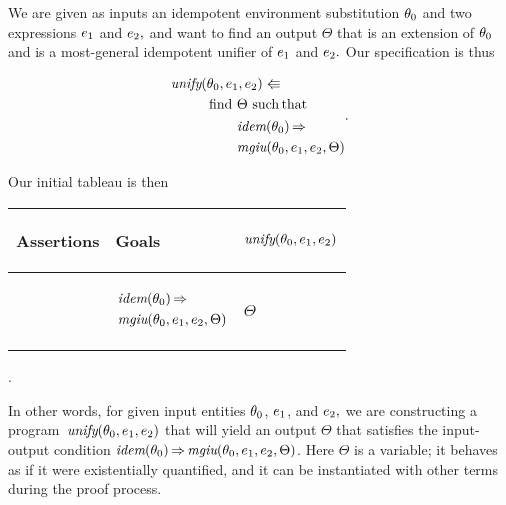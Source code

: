 \documentclass[runningheads]{llncs}
\DeclareMathOperator{\uimplies}{\Rightarrow}
\DeclareMathOperator{\unify}{\emph{unify}}
\DeclareMathOperator{\idem}{\emph{idem}}
\DeclareMathOperator{\mgiu}{\emph{mgiu}}
\begin{document}
We are given as inputs an idempotent environment substitution $\theta_{0}$ and two expressions $e_{1}$ and $e_{2},$ and want to find an output $\Theta$ that is an extension of $\theta_{0}$ and is a most-general idempotent unifier of $e_{1}$ and $e_{2}.$  Our specification is thus


\begin{alignat*}{2}
  \begin{split}
   \unify(&\thet{0}, \e{1}, \e{2}) \Lleftarrow  \\ 
&\operatorname{find} \, \Theta \,
     \operatorname{such}\operatorname{that} \\
&\begin{aligned}
  &&&&& \idem(\thet{0}) \uimplies  \\
  &&&&& \mgiu(\thet{0}, \e{1}, \e{2}, \Theta) 
   \end{aligned}
  \end{split}.
\end{alignat*}

   
\vspace*{.2cm}
\noindent Our initial tableau is then

\begin{center}  
\begin{tabular}{T}
 \hline
\begin{center}  Assertions \end{center}&
\begin{center}  Goals  \end{center}  &
\begin{center}  $\unify(\thet{0}, \e{1}, \e{2})$  \end{center}\\
 \hline\hline
  & \begin{center}$\begin{aligned}[t] &\idem(\thet{0}) \uimplies \\  &\,{\mgiu}(\thet{0}, \e{1}, \e{2} , \Theta) \\ \end{aligned}$ \end{center} & \begin{center}$\Theta$ \end{center} \\

\hline
\end{tabular}.
\end{center}
  


\noindent In other words, for given input entities $\theta_{0}$, $e_{1}$, and $e_{2},$ we are constructing a program  $\,\unify(\thet{0}, \e{1}, \e{2})$ that will yield an output $\Theta$ that satisfies the input-output condition  $\idem(\thet{0}) \uimplies {\mgiu}(\thet{0}, \e{1}, \e{2} , \Theta)$.  Here $\Theta$ is a variable; it behaves as if it were existentially quantified, and it can be instantiated with other terms during the proof process.
\end{document}

